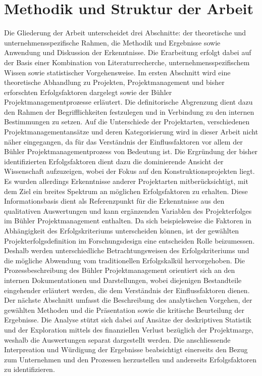 \section{Methodik und Struktur der Arbeit}
Die Gliederung der Arbeit unterscheidet drei Abschnitte: der theoretische und unternehmensspezifische Rahmen, die Methodik und Ergebnisse sowie Anwendung und Diskussion der Erkenntnisse. Die Erarbeitung erfolgt dabei auf der Basis einer Kombination von Literaturrecherche, unternehmensspezifischem Wissen sowie statistischer Vorgehensweise.
\newline\newline
Im ersten Abschnitt wird eine theoretische Abhandlung zu Projekten, Projektmanagement und bisher erforschten Erfolgsfaktoren dargelegt sowie der Bühler Projektmanagementprozesse erläutert. Die definitorische Abgrenzung dient dazu den Rahmen der Begrifflichkeiten festzulegen und in Verbindung zu den internen Bestimmungen zu setzen. Auf die Unterschiede der Projektarten, verschiedenen Projektmanagementansätze und deren Kategorisierung wird in dieser Arbeit nicht näher eingegangen, da für das Verständnis der Einflussfaktoren vor allem der Bühler Projektmanagementprozess von Bedeutung ist. Die Ergründung der bisher identifizierten Erfolgsfaktoren dient dazu die dominierende Ansicht der Wissenschaft aufzuzeigen, wobei der Fokus auf den Konstruktionsprojekten liegt. Es wurden allerdings Erkenntnisse anderer Projektarten mitberücksichtigt, mit dem Ziel ein breites Spektrum an möglichen Erfolgsfaktoren zu erhalten. Diese Informationsbasis dient als Referenzpunkt für die Erkenntnisse aus den qualitativen Auswertungen und kann ergänzenden Variablen des Projekterfolges im Bühler Projektmanagement enthalten. Da sich beispielsweise die Faktoren in Abhängigkeit des Erfolgskriteriums unterscheiden können, ist der gewählten Projekterfolgsdefinition im Forschungsdesign eine entscheiden Rolle beizumessen. Deshalb werden unterschiedliche Betrachtungsweisen des Erfolgskriteriums und die mögliche Abwendung vom traditionellen Erfolgskalkül hervorgehoben. Die Prozessbeschreibung des Bühler Projektmanagement orientiert sich an den internen Dokumentationen und Darstellungen, wobei diejenigen Bestandteile eingehender erläutert werden, die dem Verständnis der Einflussfaktoren dienen.
\newline\newline
Der nächste Abschnitt umfasst die Beschreibung des analytischen Vorgehen, der gewählten Methoden und die Präsentation sowie die kritische Beurteilung der Ergebnisse. Die Analyse stützt sich dabei auf Ansätze der deskriptiven Statistik und der Exploration mittels des finanziellen Verlust bezüglich der Projektmarge, weshalb  die Auswertungen separat dargestellt werden. Die anschliessende Interpreation und Würdigung der Ergebnisse beabsichtigt einerseits den Bezug zum Unternehmen und den Prozessen herzustellen und anderseits Erfolgsfaktoren zu identifizieren. 
